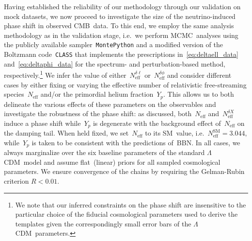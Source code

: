 \documentclass[11pt]{article}
\numberwithin{equation}{section}
\newcommand{\Neff}{N_\mathrm{eff}}
\newcommand{\Nphase}{N_\mathrm{eff}^{\delta\phi}}
\newcommand{\Nmultipole}{N_\mathrm{eff}^{\delta\ell}}
\begin{document}
Having established the reliability of our methodology through our validation on mock datasets, we now proceed to investigate the size of the neutrino-induced phase shift in observed CMB~data. To this end, we employ the same analysis methodology as in the validation stage, i.e.\ we perform MCMC~analyses using the publicly available sampler~\texttt{MontePython} and a modified version of the Boltzmann code~\texttt{CLASS} that implements the prescriptions in~\eqref{eq:deltaell_data} and~\eqref{eq:deltaphi_data} for the spectrum- and perturbation-based method, respectively.\footnote{We note that our inferred constraints on the phase shift are insensitive to the particular choice of the fiducial cosmological parameters used to derive the templates given the correspondingly small error bars of the $\Lambda$CDM~parameters.} We infer the value of either~$\Nmultipole$ or~$\Nphase$ and consider different cases by either fixing or varying the effective number of relativistic free-streaming species~$\Neff$ and/or the primordial helium fraction~$Y_p$. This allows us to both delineate the various effects of these parameters on the observables and investigate the robustness of the phase shift: as discussed, both~$\Neff$ and~$\Neff^{\delta X}$ induce a phase shift while~$Y_p$ is degenerate with the background effect of~$\Neff$ on the damping tail. When held fixed, we set~$\Neff$ to its SM~value, i.e.~$\Neff^\mathrm{SM} = 3.044$, while~$Y_p$ is taken to be consistent with the predictions of~BBN. In all cases, we always marginalize over the six baseline parameters of the standard $\Lambda$CDM~model and assume flat~(linear) priors for all sampled cosmological parameters. We ensure convergence of the chains by requiring the Gelman-Rubin criterion $R < 0.01$.\medskip
\end{document}
